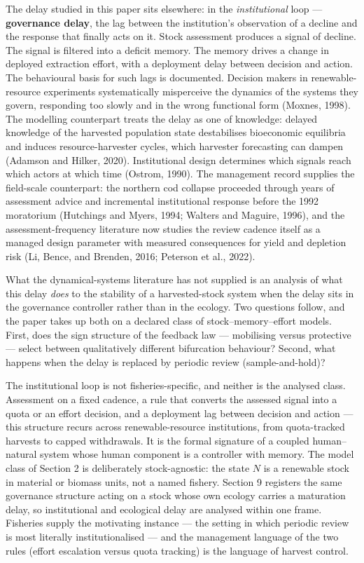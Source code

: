 \documentclass[11pt]{article}
\begin{document}
The delay studied in this paper sits elsewhere: in the
\emph{institutional} loop --- \textbf{governance delay}, the lag between
the institution's observation of a decline and the response that finally
acts on it. Stock assessment produces a signal of decline. The signal is
filtered into a deficit memory. The memory drives a change in deployed
extraction effort, with a deployment delay between decision and action.
The behavioural basis for such lags is documented. Decision makers in
renewable-resource experiments systematically misperceive the dynamics
of the systems they govern, responding too slowly and in the wrong
functional form (Moxnes, 1998). The modelling counterpart treats the
delay as one of knowledge: delayed knowledge of the harvested population
state destabilises bioeconomic equilibria and induces resource-harvester
cycles, which harvester forecasting can dampen (Adamson and Hilker,
2020). Institutional design determines which signals reach which actors
at which time (Ostrom, 1990). The management record supplies the
field-scale counterpart: the northern cod collapse proceeded through
years of assessment advice and incremental institutional response before
the 1992 moratorium (Hutchings and Myers, 1994; Walters and Maguire,
1996), and the assessment-frequency literature now studies the review
cadence itself as a managed design parameter with measured consequences
for yield and depletion risk (Li, Bence, and Brenden, 2016; Peterson et
al., 2022).

What the dynamical-systems literature has not supplied is an analysis of
what this delay \emph{does} to the stability of a harvested-stock system
when the delay sits in the governance controller rather than in the
ecology. Two questions follow, and the paper takes up both on a declared
class of stock--memory--effort models. First, does the sign structure of
the feedback law --- mobilising versus protective --- select between
qualitatively different bifurcation behaviour? Second, what happens when
the delay is replaced by periodic review (sample-and-hold)?

The institutional loop is not fisheries-specific, and neither is the
analysed class. Assessment on a fixed cadence, a rule that converts the
assessed signal into a quota or an effort decision, and a deployment lag
between decision and action --- this structure recurs across
renewable-resource institutions, from quota-tracked harvests to capped
withdrawals. It is the formal signature of a coupled human--natural
system whose human component is a controller with memory. The model
class of Section 2 is deliberately stock-agnostic: the state \(N\) is a
renewable stock in material or biomass units, not a named fishery.
Section 9 registers the same governance structure acting on a stock
whose own ecology carries a maturation delay, so institutional and
ecological delay are analysed within one frame. Fisheries supply the
motivating instance --- the setting in which periodic review is most
literally institutionalised --- and the management language of the two
rules (effort escalation versus quota tracking) is the language of
harvest control.
\end{document}
